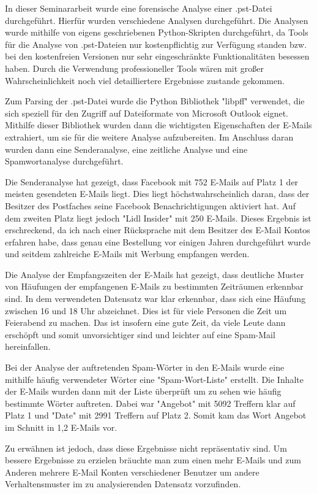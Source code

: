 In dieser Seminararbeit wurde eine forensische Analyse einer .pst-Datei durchgeführt. Hierfür wurden verschiedene Analysen durchgeführt. Die Analysen wurde mithilfe von eigens geschriebenen Python-Skripten durchgeführt, da Tools für die Analyse von .pst-Dateien nur kostenpflichtig zur Verfügung standen bzw. bei den kostenfreien Versionen nur sehr eingeschränkte Funktionalitäten besessen haben. Durch die Verwendung professioneller Tools wären mit großer Wahrscheinlichkeit noch viel detailliertere Ergebnisse zustande gekommen. 

Zum Parsing der .pst-Datei wurde die Python Bibliothek "libpff" verwendet, die sich speziell für den Zugriff auf Dateiformate von Microsoft Outlook eignet. Mithilfe dieser Bibliothek wurden dann die wichtigsten Eigenschaften der E-Mails extrahiert, um sie für die weitere Analyse aufzubereiten. Im Anschluss daran wurden dann eine Senderanalyse, eine zeitliche Analyse und eine Spamwortanalyse durchgeführt. 

Die Senderanalyse hat gezeigt, dass Facebook mit 752 E-Mails auf Platz 1 der meisten gesendeten E-Mails liegt. Dies liegt höchstwahrscheinlich daran, dass der Besitzer des Postfaches seine Facebook Benachrichtigungen aktiviert hat. Auf dem zweiten Platz liegt jedoch "Lidl Insider" mit 250 E-Mails. Dieses Ergebnis ist erschreckend, da ich nach einer Rücksprache mit dem Besitzer des E-Mail Kontos erfahren habe, dass genau eine Bestellung vor einigen Jahren durchgeführt wurde und seitdem zahlreiche E-Mails mit Werbung empfangen werden. 

Die Analyse der Empfangszeiten der E-Mails hat gezeigt, dass deutliche Muster von Häufungen der empfangenen E-Mails zu bestimmten Zeiträumen erkennbar sind. In dem verwendeten Datensatz war klar erkennbar, dass sich eine Häufung zwischen 16 und 18 Uhr abzeichnet. Dies ist für viele Personen die Zeit um Feierabend zu machen. Das ist insofern eine gute Zeit, da viele Leute dann erschöpft und somit unvorsichtiger sind und leichter auf eine Spam-Mail hereinfallen. 

Bei der Analyse der auftretenden Spam-Wörter in den E-Mails wurde eine mithilfe häufig verwendeter Wörter eine "Spam-Wort-Liste" erstellt. Die Inhalte der E-Mails wurden dann mit der Liste überprüft um zu sehen wie häufig bestimmte Wörter auftreten. Dabei war "Angebot" mit 5092 Treffern klar auf Platz 1 und "Date" mit 2991 Treffern auf Platz 2. Somit kam das Wort Angebot im Schnitt in 1,2 E-Mails vor. 

Zu erwähnen ist jedoch, dass diese Ergebnisse nicht repräsentativ sind. Um bessere Ergebnisse zu erzielen bräuchte man zum einen mehr E-Mails und zum Anderen mehrere E-Mail Konten verschiedener Benutzer um andere Verhaltensmuster im zu analysierenden Datensatz vorzufinden.
